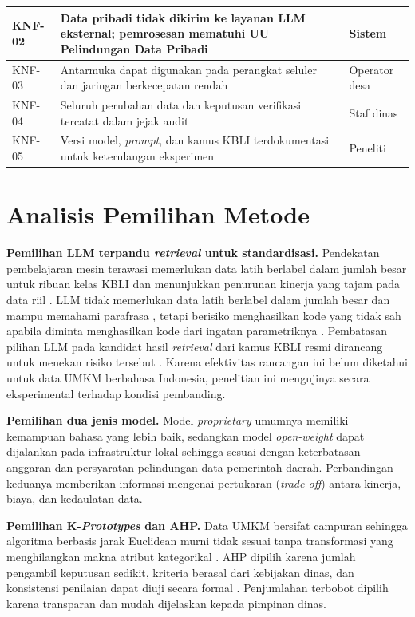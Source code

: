 \documentclass[12pt,a4paper]{report}
\begin{document}
{\begin{longtable}{|>{\centering\arraybackslash}p{}|L{0.62\textwidth}|L{0.20\textwidth}|}
KNF-02 & Data pribadi tidak dikirim ke layanan LLM eksternal; pemrosesan mematuhi UU Pelindungan Data Pribadi \cite{uupdp2022} & Sistem \\ \hline
KNF-03 & Antarmuka dapat digunakan pada perangkat seluler dan jaringan berkecepatan rendah & Operator desa \\ \hline
KNF-04 & Seluruh perubahan data dan keputusan verifikasi tercatat dalam jejak audit & Staf dinas \\ \hline
KNF-05 & Versi model, \textit{prompt}, dan kamus KBLI terdokumentasi untuk keterulangan eksperimen & Peneliti \\ \hline
\end{longtable}
}

\section{Analisis Pemilihan Metode}
\label{sec:analisis-metode}

\textbf{Pemilihan LLM terpandu \textit{retrieval} untuk standardisasi.} Pendekatan pembelajaran mesin terawasi memerlukan data latih berlabel dalam jumlah besar untuk ribuan kelas KBLI dan menunjukkan penurunan kinerja yang tajam pada data riil \cite{amnur2025kbli}. LLM tidak memerlukan data latih berlabel dalam jumlah besar dan mampu memahami parafrasa \cite{gilardi2023chatgpt,ziems2024css}, tetapi berisiko menghasilkan kode yang tidak sah apabila diminta menghasilkan kode dari ingatan parametriknya \cite{ji2023hallucination,dahl2024legal}. Pembatasan pilihan LLM pada kandidat hasil \textit{retrieval} dari kamus KBLI resmi dirancang untuk menekan risiko tersebut \cite{gao2023ragsurvey,achananuparp2025occupation}. Karena efektivitas rancangan ini belum diketahui untuk data UMKM berbahasa Indonesia, penelitian ini mengujinya secara eksperimental terhadap kondisi pembanding.

\textbf{Pemilihan dua jenis model.} Model \textit{proprietary} umumnya memiliki kemampuan bahasa yang lebih baik, sedangkan model \textit{open-weight} dapat dijalankan pada infrastruktur lokal sehingga sesuai dengan keterbatasan anggaran dan persyaratan pelindungan data pemerintah daerah. Perbandingan keduanya memberikan informasi mengenai pertukaran (\textit{trade-off}) antara kinerja, biaya, dan kedaulatan data.

\textbf{Pemilihan K-\textit{Prototypes} dan AHP.} Data UMKM bersifat campuran sehingga algoritma berbasis jarak Euclidean murni tidak sesuai tanpa transformasi yang menghilangkan makna atribut kategorikal \cite{huang1998kprototypes}. AHP dipilih karena jumlah pengambil keputusan sedikit, kriteria berasal dari kebijakan dinas, dan konsistensi penilaian dapat diuji secara formal \cite{saaty2008ahp}. Penjumlahan terbobot dipilih karena transparan dan mudah dijelaskan kepada pimpinan dinas.
\end{document}
